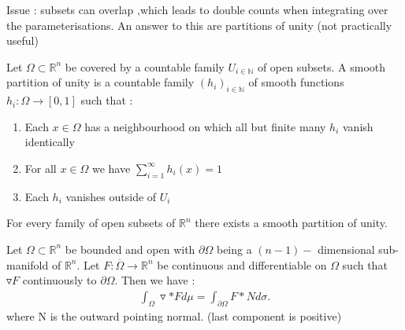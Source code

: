 Issue : subsets can overlap ,which leads to double counts when integrating over the parameterisations.
An answer to this are partitions of unity (not practically useful)
\begin{definition}
  Let $\Omega  \subset  \mathbb{R}^{n } $ be covered by a countable family $U_{i \in  \mathbb{N}}$ of open subsets.
  A smooth partition of unity is a countable family $(h_i)_{i \in  \mathbb{N}}$ of smooth functions $h_i : \Omega  \to [0,1]$ such that : 
  \begin{enumerate}
    \item Each $x \in  \Omega $ has a neighbourhood on which all but finite many $h_i$ vanish identically
    \item For all $x \in  \Omega $ we have $\sum_{i=1}^{\infty} h_i(x) = 1$
    \item Each $h_i$ vanishes outside of $U_i$
  \end{enumerate}
  For every family of open subsets of $\mathbb{R}^{n} $ there exists a smooth partition of unity.
\end{definition}
\begin{theorem}
  Let $\Omega \subset  \mathbb{R}^{n }  $ be bounded and open with $\partial \Omega $ being a 
  $(n-1)-$ dimensional sub-manifold of $\mathbb{R}^{n } $. Let $F : \overline{\Omega}  \to  \mathbb{R}^{n } $ be continuous and 
  differentiable on $\Omega $ such that $\triangledown F$ continuously to $\partial \Omega $. Then we have : 
  \begin{align*}
    \int_{\Omega } \triangledown * F d\mu = \int_{\partial \Omega } F * N d\sigma
  .\end{align*}
  where N is the outward pointing normal. (last component is positive)
\end{theorem}
